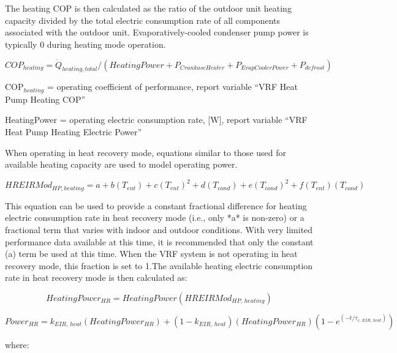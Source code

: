 The heating COP is then calculated as the ratio of the outdoor unit heating capacity divided by the total electric consumption rate of all components associated with the outdoor unit. Evaporatively-cooled condenser pump power is typically 0 during heating mode operation.

\begin{equation}
  COP_{heating} = \dot{Q}_{heating,total} / \left( HeatingPower + P_{CrankaseHeater} + P_{EvapCoolerPower} + P_{defrost} \right)
\end{equation}

COP\(_{heating}\) = operating coefficient of performance, report variable ``VRF Heat Pump Heating COP''

HeatingPower = operating electric consumption rate, [W], report variable ``VRF Heat Pump Heating Electric Power''

When operating in heat recovery mode, equations similar to those used for available heating capacity are used to model operating power.

\begin{equation}
  HREIRMod_{HP,heating} = a + b \left( T_{ent} \right) + c \left( T_{ent} \right)^2 + d \left( T_{cond} \right) + e \left( T_{cond} \right)^2 + f \left( T_{ent} \right) \left( T_{cond} \right)
\end{equation}

This equation can be used to provide a constant fractional difference for heating electric consumption rate in heat recovery mode (i.e., only *a* is non-zero) or a fractional term that varies with indoor and outdoor conditions. With very limited performance data available at this time, it is recommended that only the constant (a) term be used at this time. When the VRF system is not operating in heat recovery mode, this fraction is set to 1.The available heating electric consumption rate in heat recovery mode is then calculated as:

\begin{equation}
  HeatingPower_{HR} = HeatingPower \left( HREIRMod_{HP,\,heating} \right)
\end{equation}

\begin{equation}
  Power_{HR} = k_{EIR,\,heat} \left( HeatingPower_{HR} \right) + \left( 1 - k_{EIR,\,heat} \right) \left( HeatingPower_{HR} \right) \left( 1 - e^{\left( -t / \tau_{c,\,EIR,\,heat} \right)} \right)
\end{equation}

where:

